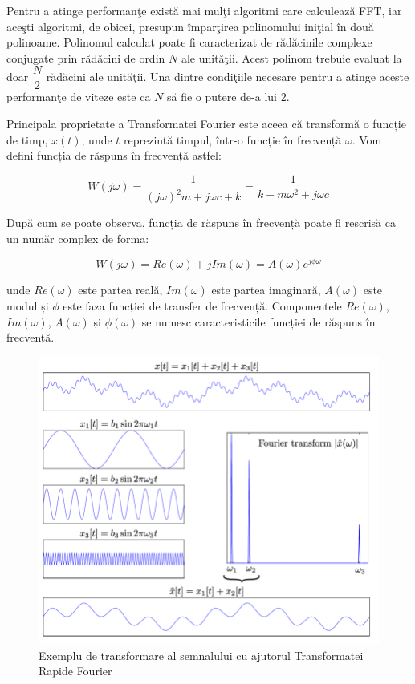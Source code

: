 	
	Pentru a atinge performan\c{t}e exist\u{a} mai mul\c{t}i algoritmi care calculeaz\u{a} FFT, iar ace\c{s}ti algoritmi, de obicei, presupun \^{i}mpar\c{t}irea polinomului ini\c{t}ial \^{i}n dou\u{a} polinoame. Polinomul calculat poate fi caracterizat de r\u{a}d\u{a}cinile complexe conjugate prin r\u{a}d\u{a}cini de ordin $N$ ale unit\u{a}\c{t}ii. Acest polinom trebuie evaluat la doar $\dfrac{N}{2}$ r\u{a}d\u{a}cini ale unit\u{a}\c{t}ii. Una dintre condi\c{t}iile necesare pentru a atinge aceste performan\c{t}e de viteze este ca $N$ s\u{a} fie o putere de-a lui 2.
	
	Principala proprietate a Transformatei Fourier este aceea că transformă o funcție de timp, $x(t)$, unde $t$ reprezintă timpul, într-o funcție în frecvență $\omega$. Vom defini funcția de răspuns în frecvență astfel:
	
	\begin{equation}
		W(j\omega)= \frac{1}{(j\omega)^2m+j\omega c + k}=\frac{1}{k-m\omega^2+j\omega c}
	\end{equation}

	După cum se poate observa, funcția de răspuns în frecvență poate fi rescrisă ca un număr complex de forma:
	
	\begin{equation}
		W(j\omega)=Re(\omega)+jIm(\omega)=A(\omega)e^{j\phi \omega}
	\end{equation}
	
	\noindent unde $Re(\omega)$ este partea reală, $Im(\omega)$ este partea imaginară, $A(\omega)$ este modul și $\phi$ este faza funcției de transfer de frecvență. Componentele $Re(\omega)$, $Im(\omega)$, $A(\omega)$ și $\phi(\omega)$ se numesc caracteristicile funcției de răspuns în frecvență.
	
	\begin{figure}[!htb]
		\centering
		\includegraphics[width=15cm]{imagini/fft.png}
		\caption{Exemplu de transformare al semnalului cu ajutorul Transformatei Rapide Fourier}
		\label{Fig14}
	\end{figure}
	
